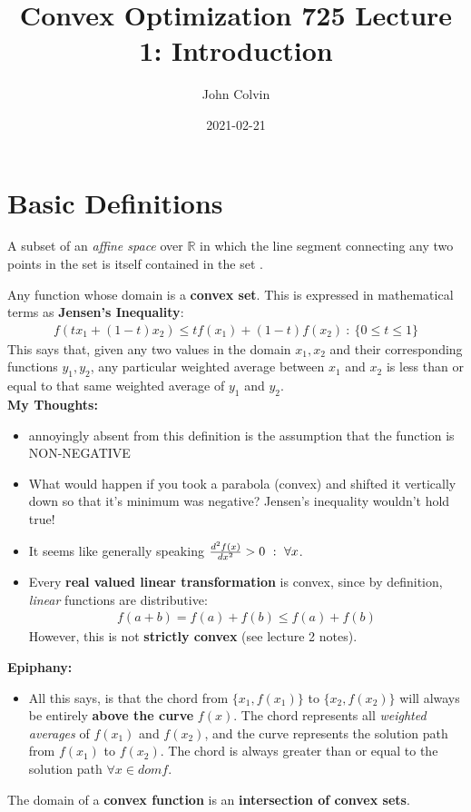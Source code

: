 \documentclass{article}
\title{Convex Optimization 725 Lecture 1: Introduction}
\date{2021-02-21}
\author{John Colvin}
\begin{document}
\maketitle
\section{Basic Definitions}
\begin{definition}
  A subset of an \textit{affine space} over $\mathbb{R}$ in which the line
  segment connecting any two points in the set is itself contained in the set .
\end{definition}
\begin{definition}
  Any function whose domain is a \textbf{convex set}.  This is expressed
  in mathematical terms as \textbf{Jensen's Inequality}:
  \begin{align}
    f(tx_1+(1-t)x_2)\leq tf(x_1)+(1-t)f(x_2)~:~\{0\leq t\leq 1\}
  \end{align}
  This says that, given any two values in the domain $x_1,x_2$ and
  their corresponding functions $y_1,y_2$, any particular weighted average
  between $x_1$ and $x_2$ is less than or equal to that same weighted average
  of $y_1$ and $y_2$.\\
  \vpush
  \textbf{My Thoughts:}
  \begin{itemize}
    \item annoyingly absent from this definition is the assumption that the
          function is NON-NEGATIVE
    \item What would happen if you took a parabola (convex) and shifted it
          vertically down so that it's minimum was negative?  Jensen's
          inequality wouldn't hold true!
    \item It seems like generally speaking ${d^2f(x)\over dx^2}>0~:~\forall x$.
    \item Every \textbf{real valued linear transformation} is convex, since by
          definition, \textit{linear} functions are distributive:
    \begin{align}
      f(a+b)=f(a)+f(b)\leq f(a)+f(b)
    \end{align}
          However, this is not \textbf{strictly convex} (see lecture 2 notes).
  \end{itemize}
  \textbf{Epiphany:}
  \begin{itemize}
    \item All this says, is that the chord from $\{x_1, f(x_1)\}$ to $\{x_2, f(x_2)\}$
    will always be entirely \textbf{above the curve} $f(x)$.  The chord represents
    all \textit{weighted averages} of $f(x_1)$ and $f(x_2)$, and the curve represents
    the solution path from $f(x_1)$ to $f(x_2)$.  The chord is always greater than or equal
    to the solution path $\forall x \in dom f$.
  \end{itemize}
  The domain of a \textbf{convex function} is an \textbf{intersection of convex sets}.
\end{definition}
\end{document}
